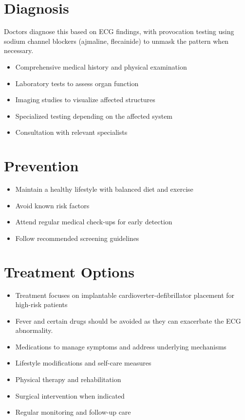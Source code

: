 \section{Diagnosis}
Doctors diagnose this based on ECG findings, with provocation testing using sodium channel blockers (ajmaline, flecainide) to unmask the pattern when necessary.

\begin{itemize}[noitemsep]
  \item Comprehensive medical history and physical examination
  \item Laboratory tests to assess organ function
  \item Imaging studies to visualize affected structures
  \item Specialized testing depending on the affected system
  \item Consultation with relevant specialists
\end{itemize}
\section{Prevention}
\begin{itemize}[noitemsep]
  \item Maintain a healthy lifestyle with balanced diet and exercise
  \item Avoid known risk factors
  \item Attend regular medical check-ups for early detection
  \item Follow recommended screening guidelines
\end{itemize}
\section{Treatment Options}
\begin{itemize}[noitemsep]
  \item Treatment focuses on implantable cardioverter-defibrillator placement for high-risk patients
  \item Fever and certain drugs should be avoided as they can exacerbate the ECG abnormality.
  \item Medications to manage symptoms and address underlying mechanisms
  \item Lifestyle modifications and self-care measures
  \item Physical therapy and rehabilitation
  \item Surgical intervention when indicated
  \item Regular monitoring and follow-up care
\end{itemize}
